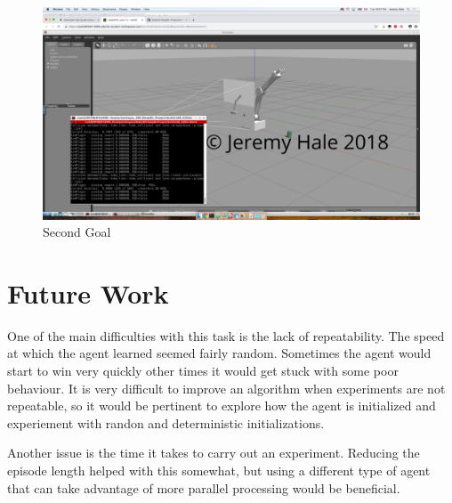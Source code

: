 \documentclass[10pt,journal,compsoc]{IEEEtran}
\begin{document}
\begin{figure}[thpb]
    \centering
    \includegraphics[width=\linewidth]{goal2_water}
    \caption{Second Goal}
    \label{fig:second_goal}
\end{figure}

\section{Future Work}
One of the main difficulties with this task is the lack of repeatability. The speed at which the agent learned seemed fairly random. Sometimes the agent would start to win very quickly other times it would get stuck with some poor behaviour. It is very difficult to improve an algorithm when experiments are not repeatable, so it would be pertinent to explore how the agent is initialized and experiement with randon and deterministic initializations.

Another issue is the time it takes to carry out an experiment. Reducing the episode length helped with this somewhat, but using a different type of agent that can take advantage of more parallel processing would be beneficial.
\end{document}
